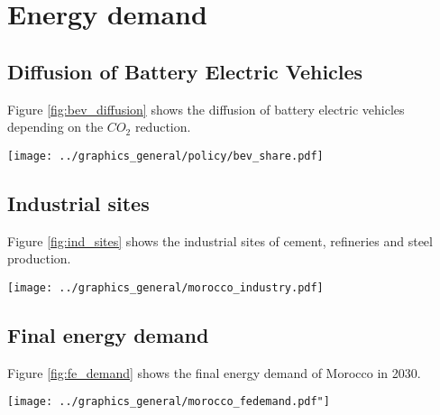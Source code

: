

\section{Energy demand}

\subsection{Diffusion of Battery Electric Vehicles}
\label{subsec:bev_diffusion}
Figure \ref{fig:bev_diffusion} shows the diffusion of battery electric vehicles depending on the $CO_2$ reduction.

\begin{figure*}[h]
    \centering
    \texttt{[image: ../graphics\_general/policy/bev\_share.pdf]}
    \caption{Market diffusion of Battery Electricity Vehicles in Morocco, synthesized based on an s-curve with a growth rate $k=0.2$ and inflection point $x_0=2040$.}
    \label{fig:bev_diffusion}
\end{figure*}

\subsection{Industrial sites}

Figure \ref{fig:ind_sites} shows the industrial sites of cement, refineries and steel production.

\begin{figure*}[h]
    \centering
    \texttt{[image: ../graphics\_general/morocco\_industry.pdf]}
    \caption{Industrial sites in Morocco.}
    \label{fig:ind_sites}
\end{figure*}

\clearpage

\subsection{Final energy demand}

Figure \ref{fig:fe_demand} shows the final energy demand of Morocco in 2030.

\begin{figure*}[h]
    \centering
    \texttt{[image: ../graphics\_general/morocco\_fedemand.pdf"]}
    \caption{Final energy demand of Morocco in 2030 (TODO: NEEDS REVISION)}
    \label{fig:fe_demand}
\end{figure*}

\clearpage